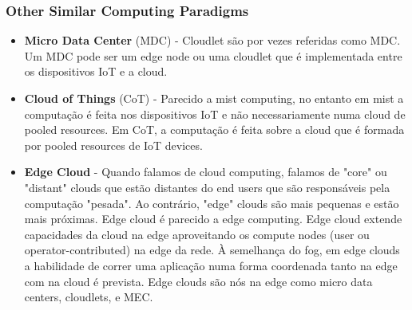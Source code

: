 \subsubsection{Other Similar Computing Paradigms}
\begin{itemize}
	\item \textbf{Micro Data Center} (MDC) - Cloudlet são por vezes referidas
	como MDC. Um MDC pode ser um edge node ou uma cloudlet que é implementada
	entre os dispositivos IoT e a cloud.
	\item \textbf{Cloud of Things} (CoT) - Parecido a mist computing, no entanto
	em mist a computação é feita nos dispositivos IoT e não necessariamente numa
	cloud de pooled resources. Em CoT, a computação é feita sobre a cloud que é
	formada por pooled resources de IoT devices.
	\item \textbf{Edge Cloud} - Quando falamos de cloud computing, falamos de
	"core" ou "distant" clouds que estão distantes do end users que são
	responsáveis pela computação "pesada". Ao contrário, "edge" clouds são mais
	pequenas e estão mais próximas. Edge cloud é parecido a edge computing. Edge
	cloud extende capacidades da cloud na edge aproveitando os compute nodes
	(user ou operator-contributed) na edge da rede. À semelhança do fog, em edge
	clouds a habilidade de correr uma aplicação numa forma coordenada tanto na
	edge com na cloud é prevista. Edge clouds são nós na edge como micro data
	centers, cloudlets, e MEC.
\end{itemize}


